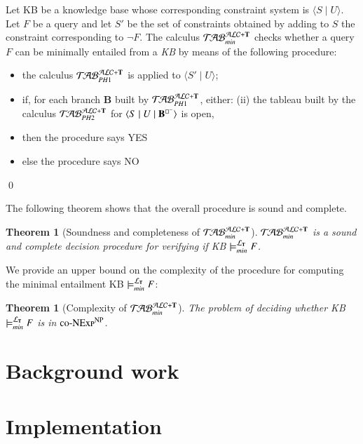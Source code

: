 \documentclass[a4paper, 11pt, oneside]{elsarticle}
\newcommand{\tip}{{\bf T}}
\newcommand{\nott} {\lnot}
\newcommand{\tc} {\mid}
\newcommand{\bbox}{\square}
\newcommand{\sx} {\langle}
\newcommand{\dx} {\rangle}
\newcommand{\ellet} {\mathcal{L}_{\bf T}}
\newcommand{\nuovoc}{\mathrel{{\mathcal{T}\!\mathcal{AB}}}_{min}^{\mathcal{ALC}+\mbox{\scriptsize $\tip$}}}
\newcommand{\primo}{\mathrel{{\mathcal{T}\!\mathcal{AB}}}_{PH 1}^{\mathcal{ALC}+\mbox{\scriptsize $\tip$}}}
\newcommand{\secondo}{\mathrel{{\mathcal{T}\!\mathcal{AB}}}_{PH 2}^{\mathcal{ALC}+\mbox{\scriptsize $\tip$}}}
\newenvironment{definition}
{\begin{defi} \rm}{\qed \end{defi}}
\newtheorem{theorem}{Theorem}
\newcounter{posu}
\newtheorem{theorem}[posu]{Theorem}
\newtheorem{definition}[posu]{Definition}
\begin{document}
\begin{definition}\label{def processo}
Let KB be a knowledge base whose corresponding constraint system is $\sx S \tc U \dx$. Let $F$ be a query and let $S'$ be the set of
constraints obtained by adding to $S$ the constraint corresponding to $\nott F$.
The calculus $\nuovoc$ checks whether a query $F$ can be minimally entailed from a \emph{KB} by means of the following procedure:
\begin{itemize}
\item the calculus $\primo$ is applied to $\sx S' \tc U
\dx$;  \item if, for each branch {\bf B} built by $\primo$,
either:  \subitem(ii) {the
tableau built by the calculus $\secondo$ for $\sx S \tc U \tc {\bf
B}^{\bbox^{-}} \dx$ is open, } \item[] then the procedure says \textsc{YES}
\item[] else the procedure says \textsc{NO}
\end{itemize}
\end{definition}

\noindent The following theorem shows that the overall procedure is sound
and complete.


\begin{theorem}[Soundness and completeness of $\nuovoc$]\label{Soundness e completeness nuovoc}
$\nuovoc$ is  a sound and complete decision procedure for
verifying if KB $\models_{min}^{\ellet} F$.
\end{theorem}

We provide an upper bound on the complexity of the
procedure for computing the minimal entailment KB
$\models_{min}^{\ellet} F$:

\begin{theorem}[Complexity of $\nuovoc$]\label{overall complexity}
The problem of deciding whether \emph{KB} $\models_{min}^{\ellet} F$ is
in $\textsc{co-NExp}^\textsc{NP}$.
\end{theorem}




\section{Background work}


\section{Implementation}
\end{document}
